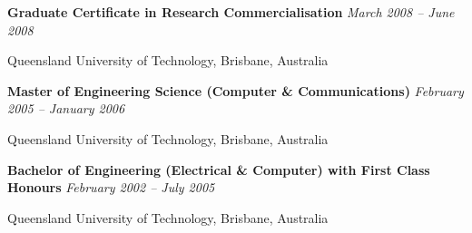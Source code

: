\documentclass[margin,line]{resume}
\newenvironment{list1}{
  \begin{list}{}{%
      \setlength{\itemsep}{0in}
      \setlength{\parsep}{0in} \setlength{\parskip}{0in}
      \setlength{\topsep}{0in} \setlength{\partopsep}{0in}
      \setlength{\leftmargin}{0.17in}}}{\end{list}}
\newenvironment{list2}{
  \begin{list}{$\bullet$}{%
      \setlength{\itemsep}{0in}
      \setlength{\parsep}{0in} \setlength{\parskip}{0in}
      \setlength{\topsep}{0in} \setlength{\partopsep}{0in}
      \setlength{\leftmargin}{0.2in}}}{\end{list}}
\begin{document}
\begin{resume}
{\bf Graduate Certificate in Research Commercialisation} \hfill {\it March 2008 -- June 2008}\\\vspace{-0.85\baselineskip}
\begin{list1}
\item[] Queensland University of Technology, Brisbane, Australia
\end{list1}

{\bf Master of Engineering Science (Computer \& Communications)} \hfill {\it February 2005 -- January 2006}\\\vspace{-0.85\baselineskip}
\begin{list1}
\item[] Queensland University of Technology, Brisbane, Australia
\end{list1}

{\bf Bachelor of Engineering (Electrical \& Computer) with First Class Honours} \hfill {\it February 2002 -- July 2005} \\\vspace{-0.85\baselineskip}
\begin{list1}
\item[] Queensland University of Technology, Brisbane, Australia
\end{list1}


\end{resume}
\end{document}
